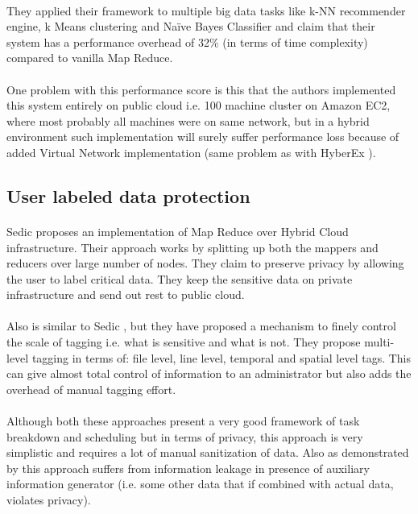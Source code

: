 \documentclass[12pt]{report}
\theoremstyle{named}
\begin{document}
\paragraph{}
They applied their framework to multiple big data tasks like k-NN recommender engine, k Means clustering and Naïve Bayes Classifier and claim that their system has a performance overhead of 32\% (in terms of time complexity) compared to vanilla Map Reduce.
\paragraph{}
One problem with this performance score is this that the authors implemented this system entirely on public cloud i.e. 100 machine cluster on Amazon EC2, where most probably all machines were on same network, but in a hybrid environment such implementation will surely suffer performance loss because of added Virtual Network implementation (same problem as with HyberEx \cite{ko2011hybrex}).
\subsection{User labeled data protection}
\paragraph{}
Sedic \cite{zhang2011sedic} proposes an implementation of Map Reduce over Hybrid Cloud infrastructure. Their approach works by splitting up both the mappers and reducers over large number of nodes. They claim to preserve privacy by allowing the user to label critical data. They keep the sensitive data on private infrastructure and send out rest to public cloud.
\paragraph{}
\cite{xu2015framework} Also is similar to Sedic \cite{zhang2011sedic}, but they have proposed a mechanism to finely control the scale of tagging i.e. what is sensitive and what is not. They propose multi-level tagging in terms of: file level, line level, temporal and spatial level tags. This can give almost total control of information to an administrator but also adds the overhead of manual tagging effort.
\paragraph{}
Although both these approaches present a very good framework of task breakdown and scheduling but in terms of privacy, this approach is very simplistic and requires a lot of manual sanitization of data. Also as demonstrated by \cite{dwork2004privacy} this approach suffers from information leakage in presence of auxiliary information generator (i.e. some other data that if combined with actual data, violates privacy).
\end{document}
